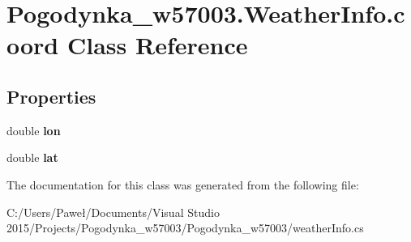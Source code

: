 \hypertarget{class_pogodynka__w57003_1_1_weather_info_1_1coord}{}\section{Pogodynka\+\_\+w57003.\+Weather\+Info.\+coord Class Reference}
\label{class_pogodynka__w57003_1_1_weather_info_1_1coord}
\subsection*{Properties}
\begin{DoxyCompactItemize}
\item 
\mbox{\label{class_pogodynka__w57003_1_1_weather_info_1_1coord_a6dc94b6e0c88eee7dacdf38e8e502fcb}} 
double {\bfseries lon}
\item 
\mbox{\label{class_pogodynka__w57003_1_1_weather_info_1_1coord_af187780c76202970c1efc4f0c010d0fe}} 
double {\bfseries lat}
\end{DoxyCompactItemize}


The documentation for this class was generated from the following file\+:\begin{DoxyCompactItemize}
\item 
C\+:/\+Users/\+Paweł/\+Documents/\+Visual Studio 2015/\+Projects/\+Pogodynka\+\_\+w57003/\+Pogodynka\+\_\+w57003/weather\+Info.\+cs\end{DoxyCompactItemize}
